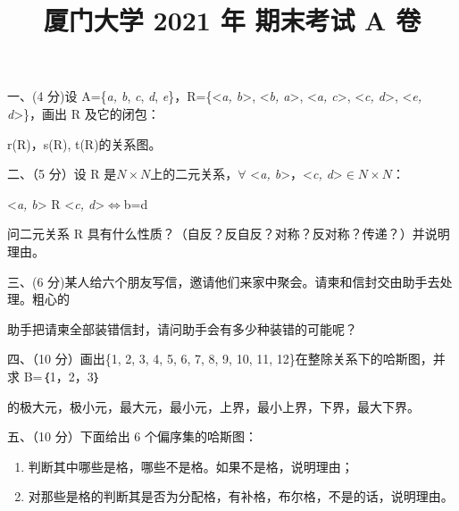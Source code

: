 \documentclass[fontset=exam]{exam-zh}
\title{厦门大学 2021 年 期末考试 A 卷}
\begin{document}
\maketitle
{}

一、(4 分)设 A=\{\emph{a, b}, \emph{c}, \emph{d}, \emph{e}\}，R=\{\textless{}\emph{a, b}\textgreater, \textless{}\emph{b, a}\textgreater, \textless{}\emph{a, c}\textgreater, \textless{}\emph{c, d}\textgreater, \textless{}\emph{e, d}\textgreater\}，画出 R 及它的闭包：

r(R)，s(R), t(R)的关系图。


二、（5 分）设 R 是\(N \times N\)上的二元关系，\(\forall\) \textless{}\emph{a, b}\textgreater，\textless{}\emph{c, d}\textgreater{}\(\in N \times N\)：

\textless{}\emph{a, b}\textgreater{} R \textless{}\emph{c, d}\textgreater{}\(\Leftrightarrow\)b=d

问二元关系 R 具有什么性质？（自反？反自反？对称？反对称？传递？）并说明理由。


三、(6 分)某人给六个朋友写信，邀请他们来家中聚会。请柬和信封交由助手去处理。粗心的

助手把请柬全部装错信封，请问助手会有多少种装错的可能呢？


四、（10 分）画出\{1, 2, 3, 4, 5, 6, 7, 8, 9, 10, 11, 12\}在整除关系下的哈斯图，并求 B=｛1，2，3｝

的极大元，极小元，最大元，最小元，上界，最小上界，下界，最大下界。


五、（10 分）下面给出 6 个偏序集的哈斯图：

\begin{enumerate}
\def\labelenumi{\arabic{enumi}.}
\item
  判断其中哪些是格，哪些不是格。如果不是格，说明理由；
\item
  对那些是格的判断其是否为分配格，有补格，布尔格，不是的话，说明理由。
\end{enumerate}
\end{document}
